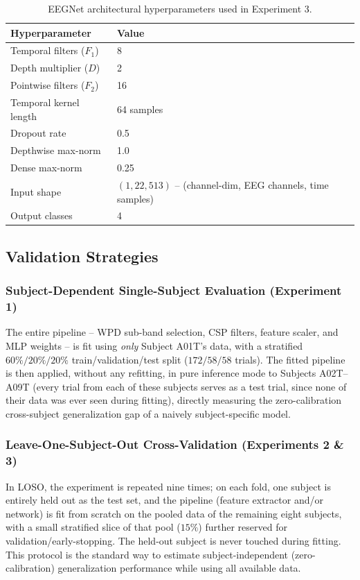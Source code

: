 \documentclass[11pt,a4paper]{article}
\begin{document}
\begin{table}[H]
\centering
\caption{EEGNet architectural hyperparameters used in Experiment 3.}
\label{tab:eegnet-hparams}
\begin{tabular}{ll}
\toprule
\textbf{Hyperparameter} & \textbf{Value} \\
\midrule
Temporal filters ($F_1$) & 8 \\
Depth multiplier ($D$) & 2 \\
Pointwise filters ($F_2$) & 16 \\
Temporal kernel length & 64 samples \\
Dropout rate & 0.5 \\
Depthwise max-norm & 1.0 \\
Dense max-norm & 0.25 \\
Input shape & $(1, 22, 513)$ -- (channel-dim, EEG channels, time samples) \\
Output classes & 4 \\
\bottomrule
\end{tabular}
\end{table}

\subsection{Validation Strategies}

\subsubsection{Subject-Dependent Single-Subject Evaluation (Experiment 1)}
The entire pipeline -- WPD sub-band selection, CSP filters, feature scaler, and MLP weights -- is fit
using \emph{only} Subject A01T's data, with a stratified $60\%/20\%/20\%$ train/validation/test split
($172/58/58$ trials). The fitted pipeline is then applied, without any refitting, in pure inference
mode to Subjects A02T--A09T (every trial from each of these subjects serves as a test trial, since
none of their data was ever seen during fitting), directly measuring the zero-calibration
cross-subject generalization gap of a naively subject-specific model.

\subsubsection{Leave-One-Subject-Out Cross-Validation (Experiments 2 \& 3)}
In LOSO, the experiment is repeated nine times; on each fold, one subject is entirely held out as the
test set, and the pipeline (feature extractor and/or network) is fit from scratch on the pooled data
of the remaining eight subjects, with a small stratified slice of that pool ($15\%$) further reserved
for validation/early-stopping. The held-out subject is never touched during fitting. This protocol is
the standard way to estimate subject-independent (zero-calibration) generalization performance while
using all available data.
\end{document}
